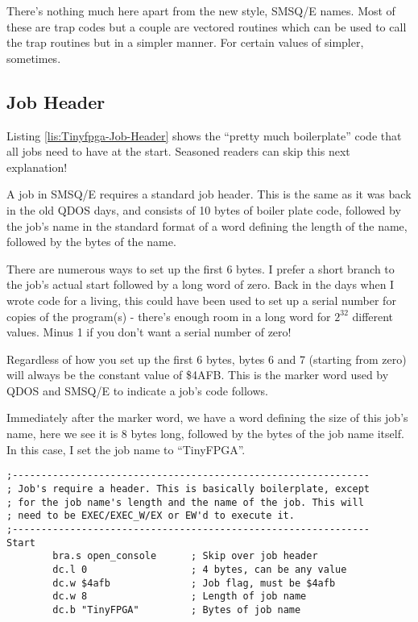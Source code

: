 There's nothing much here apart from the new style, SMSQ/E names.
Most of these are trap codes but a couple are vectored routines which
can be used to call the trap routines but in a simpler manner. For
certain values of simpler, sometimes.

\subsection{Job Header}

Listing \ref{lis:Tinyfpga-Job-Header} shows the ``pretty much boilerplate''
code that all jobs need to have at the start. Seasoned readers can
skip this next explanation!

A job in SMSQ/E requires a standard job header. This is the same as
it was back in the old QDOS days, and consists of 10 bytes of boiler
plate code, followed by the job's name in the standard format of a
word defining the length of the name, followed by the bytes of the
name.

There are numerous ways to set up the first 6 bytes. I prefer a short
branch to the job's actual start followed by a long word of zero.
Back in the days when I wrote code for a living, this could have been
used to set up a serial number for copies of the program(s) - there's
enough room in a long word for $2^{32}$ different values. Minus 1
if you don't want a serial number of zero!

Regardless of how you set up the first 6 bytes, bytes 6 and 7 (starting
from zero) will always be the constant value of \$4AFB. This is the
marker word used by QDOS and SMSQ/E to indicate a job's code follows.

Immediately after the marker word, we have a word defining the size
of this job's name, here we see it is 8 bytes long, followed by the
bytes of the job name itself. In this case, I set the job name to
``TinyFPGA''.

\begin{lstlisting}[caption={Tinyfpga - Job Header},label={lis:Tinyfpga-Job-Header}]
;--------------------------------------------------------------
; Job's require a header. This is basically boilerplate, except
; for the job name's length and the name of the job. This will
; need to be EXEC/EXEC_W/EX or EW'd to execute it.
;--------------------------------------------------------------
Start
        bra.s open_console      ; Skip over job header
        dc.l 0                  ; 4 bytes, can be any value
        dc.w $4afb              ; Job flag, must be $4afb
        dc.w 8                  ; Length of job name
        dc.b "TinyFPGA"         ; Bytes of job name

\end{lstlisting}

